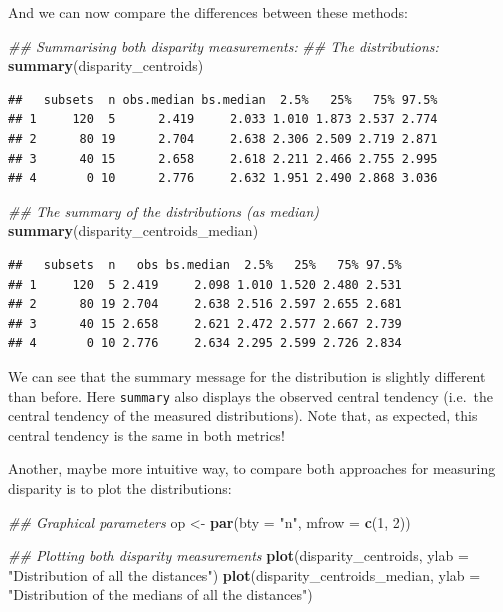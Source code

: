 \documentclass[]{book}
\newenvironment{Shaded}{\begin{snugshade}}{\end{snugshade}}
\newcommand{\CommentTok}[1]{\textcolor[rgb]{0.56,0.35,0.01}{\textit{#1}}}
\newcommand{\DataTypeTok}[1]{\textcolor[rgb]{0.13,0.29,0.53}{#1}}
\newcommand{\DecValTok}[1]{\textcolor[rgb]{0.00,0.00,0.81}{#1}}
\newcommand{\KeywordTok}[1]{\textcolor[rgb]{0.13,0.29,0.53}{\textbf{#1}}}
\newcommand{\NormalTok}[1]{#1}
\newcommand{\StringTok}[1]{\textcolor[rgb]{0.31,0.60,0.02}{#1}}
\begin{document}
And we can now compare the differences between these methods:

\begin{Shaded}
\begin{Highlighting}[]
\CommentTok{## Summarising both disparity measurements:}
\CommentTok{## The distributions:}
\KeywordTok{summary}\NormalTok{(disparity_centroids)}
\end{Highlighting}
\end{Shaded}

\begin{verbatim}
##   subsets  n obs.median bs.median  2.5%   25%   75% 97.5%
## 1     120  5      2.419     2.033 1.010 1.873 2.537 2.774
## 2      80 19      2.704     2.638 2.306 2.509 2.719 2.871
## 3      40 15      2.658     2.618 2.211 2.466 2.755 2.995
## 4       0 10      2.776     2.632 1.951 2.490 2.868 3.036
\end{verbatim}

\begin{Shaded}
\begin{Highlighting}[]
\CommentTok{## The summary of the distributions (as median)}
\KeywordTok{summary}\NormalTok{(disparity_centroids_median)}
\end{Highlighting}
\end{Shaded}

\begin{verbatim}
##   subsets  n   obs bs.median  2.5%   25%   75% 97.5%
## 1     120  5 2.419     2.098 1.010 1.520 2.480 2.531
## 2      80 19 2.704     2.638 2.516 2.597 2.655 2.681
## 3      40 15 2.658     2.621 2.472 2.577 2.667 2.739
## 4       0 10 2.776     2.634 2.295 2.599 2.726 2.834
\end{verbatim}

We can see that the summary message for the distribution is slightly different than before.
Here \texttt{summary} also displays the observed central tendency (i.e.~the central tendency of the measured distributions).
Note that, as expected, this central tendency is the same in both metrics!

Another, maybe more intuitive way, to compare both approaches for measuring disparity is to plot the distributions:

\begin{Shaded}
\begin{Highlighting}[]
\CommentTok{## Graphical parameters}
\NormalTok{op <-}\StringTok{ }\KeywordTok{par}\NormalTok{(}\DataTypeTok{bty =} \StringTok{"n"}\NormalTok{, }\DataTypeTok{mfrow =} \KeywordTok{c}\NormalTok{(}\DecValTok{1}\NormalTok{, }\DecValTok{2}\NormalTok{))}

\CommentTok{## Plotting both disparity measurements}
\KeywordTok{plot}\NormalTok{(disparity_centroids,}
     \DataTypeTok{ylab =} \StringTok{"Distribution of all the distances"}\NormalTok{)}
\KeywordTok{plot}\NormalTok{(disparity_centroids_median,}
     \DataTypeTok{ylab =} \StringTok{"Distribution of the medians of all the distances"}\NormalTok{)}
\end{Highlighting}
\end{Shaded}
\end{document}
